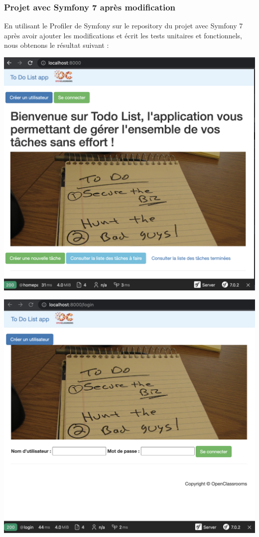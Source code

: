 \documentclass{article}
\theoremstyle{definition}
\theoremstyle{remark}
\begin{document}
\subsubsection{Projet avec Symfony 7 après modification}

En utilisant le Profiler de Symfony sur le repository du projet avec Symfony 7 après avoir ajouter les modifications et écrit les tests unitaires et fonctionnels, nous obtenons le résultat suivant : 

\hspace*{2cm}

\includegraphics[scale=0.4]{Capture_profiler_apres_modif/Profiler_new_homepage.png}

\hspace*{2cm}

\includegraphics[scale=0.4]{Capture_profiler_apres_modif/Profiler_new_login.png}
\end{document}
